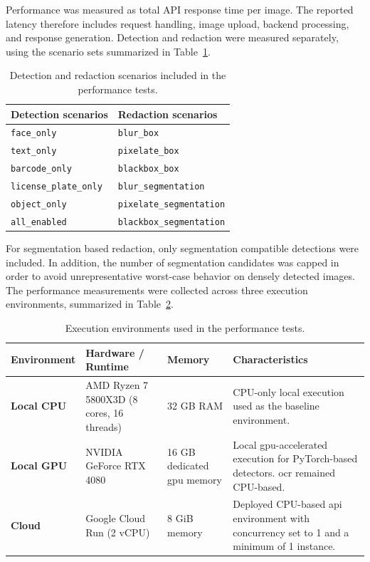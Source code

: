 
Performance was measured as total API response time per image. The reported latency therefore includes request handling, image upload, backend processing, and response generation. Detection and redaction were measured separately, using the scenario sets summarized in Table~\ref{tab:det_red_scenarios}.

\begin{table}[H]
\centering
\small
\begin{tabularx}{0.8\textwidth}{X X}
\toprule
\textbf{Detection scenarios} & \textbf{Redaction scenarios} \\
\midrule
\texttt{face\_only} & \texttt{blur\_box} \\
\texttt{text\_only} & \texttt{pixelate\_box} \\
\texttt{barcode\_only} & \texttt{blackbox\_box} \\
\texttt{license\_plate\_only} & \texttt{blur\_segmentation} \\
\texttt{object\_only} & \texttt{pixelate\_segmentation} \\
\texttt{all\_enabled} & \texttt{blackbox\_segmentation} \\
\bottomrule
\end{tabularx}


\caption{Detection and redaction scenarios included in the performance tests.}
\label{tab:det_red_scenarios}
\end{table}

For \gls{segmentation} based redaction, only \gls{segmentation} compatible detections were included. In addition, the number of \gls{segmentation} candidates was capped in order to avoid unrepresentative worst-case behavior on densely detected images. The performance measurements were collected across three execution environments, summarized in Table~\ref{tab:performance_environments}.

\begin{table}[H]
\centering
\begin{tabular}{|p{2.6cm}|p{4.3cm}|p{3.2cm}|p{4.2cm}|}
\hline
\textbf{Environment} & \textbf{Hardware / Runtime} & \textbf{Memory} & \textbf{Characteristics} \\ \hline

\textbf{Local CPU} & 
AMD Ryzen 7 5800X3D (8 cores, 16 threads) & 
32 GB RAM & 
CPU-only local execution used as the baseline environment. \\ \hline

\textbf{Local GPU} & 
NVIDIA GeForce RTX 4080 & 
16 GB dedicated \gls{gpu} memory & 
Local \gls{gpu}-accelerated execution for PyTorch-based detectors. \acrshort{ocr} remained CPU-based. \\ \hline

\textbf{Cloud} & 
Google Cloud Run (2 vCPU) & 
8 GiB memory & 
Deployed CPU-based \acrshort{api} environment with concurrency set to 1 and a minimum of 1 instance. \\ \hline

\end{tabular}
\caption{Execution environments used in the performance tests.}
\label{tab:performance_environments}
\end{table}


